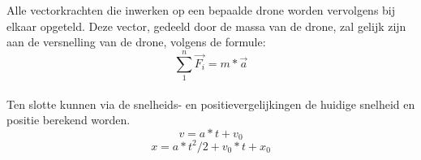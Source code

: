 Alle vectorkrachten die inwerken op een bepaalde drone worden vervolgens bij elkaar opgeteld. Deze vector, gedeeld door de massa van de drone, zal gelijk zijn aan de versnelling van de drone, volgens de formule: \\
\begin{equation*}
	\sum_{1}^{n} \vec{F_i} = m * \vec{a} 
\end{equation*}
\\
Ten slotte kunnen via de snelheids- en positievergelijkingen de huidige snelheid en positie berekend worden. \\
\begin{equation*}
v = a*t + v_0
\end{equation*} 
\begin{equation*}
x = a*t^{2}/2 + v_0*t + x_0
\end{equation*}

